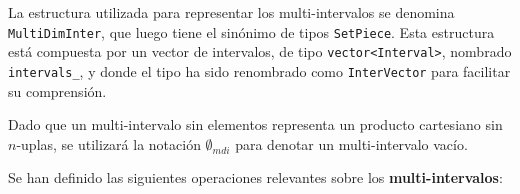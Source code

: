 La estructura utilizada para representar los multi-intervalos se denomina \texttt{MultiDimInter}, que luego tiene el sinónimo de tipos \texttt{SetPiece}. Esta estructura está compuesta por un vector de intervalos, de tipo \texttt{vector<Interval>}, nombrado \texttt{intervals\_}, y donde el tipo ha sido renombrado como \texttt{InterVector} para facilitar su comprensión.

Dado que un multi-intervalo sin elementos representa un producto cartesiano sin $n$-uplas, se utilizará la notación $\emptyset_{mdi}$ para denotar un multi-intervalo vacío. 

 
Se han definido las siguientes operaciones relevantes sobre los \textbf{multi-intervalos}:

\begin{itemize}

\end{itemize}
